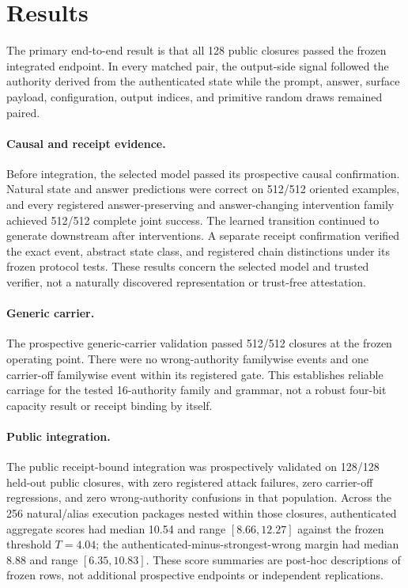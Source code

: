 \section{Results}

The primary end-to-end result is that all 128 public closures passed the frozen
integrated endpoint. In every matched pair, the output-side signal followed the
authority derived from the authenticated state while the prompt, answer,
surface payload, configuration, output indices, and primitive random draws
remained paired.

\paragraph{Causal and receipt evidence.}
Before integration, the selected model passed its prospective causal
confirmation. Natural state and answer predictions were correct on 512/512
oriented examples, and every registered answer-preserving and
answer-changing intervention family achieved 512/512 complete joint success.
The learned transition continued to generate downstream \zthree{} after
\ztwo{} interventions. A separate receipt confirmation verified the exact
event, abstract state class, and registered chain distinctions under its frozen
protocol tests. These results concern the selected model and trusted verifier,
not a naturally discovered representation or trust-free attestation.

\paragraph{Generic carrier.}
The prospective generic-carrier validation passed 512/512 closures at the
frozen operating point. There were no wrong-authority familywise events and one
carrier-off familywise event within its registered gate. This establishes
reliable carriage for the tested 16-authority family and grammar, not a robust
four-bit capacity result or receipt binding by itself.



\paragraph{Public integration.}
The public receipt-bound integration was prospectively validated on 128/128
held-out public closures, with zero registered attack failures, zero
carrier-off regressions, and zero wrong-authority confusions in that
population. Across the 256 natural/alias execution packages nested within those
closures, authenticated aggregate scores had median 10.54 and range
$[8.66,12.27]$ against the frozen threshold $T=4.04$; the
authenticated-minus-strongest-wrong margin had median 8.88 and range
$[6.35,10.83]$. These score summaries are post-hoc descriptions of frozen rows,
not additional prospective endpoints or independent replications.

